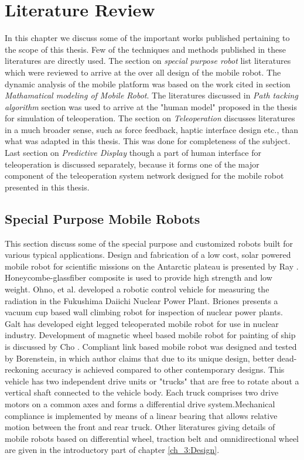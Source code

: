 \setcounter{secnumdepth}{4} 
\chapter{Literature Review}
\label{c2_LitRev}

In this chapter we  discuss some of the important works published pertaining to the scope of this thesis. Few of the techniques and methods published in these literatures are directly used. The section on \textit{special purpose robot} list literatures which were reviewed to arrive at the over all design of the mobile robot. The dynamic analysis of the mobile platform was based on the work cited in section\textit{ Mathamatical modeling of Mobile Robot}. The literatures discussed in \textit{Path tacking algorithm}  section was used to arrive at the "human model" proposed in the thesis for simulation of teleoperation. The section on \textit{Teleoperation} discusses literatures in a much broader sense, such as force feedback, haptic interface  design etc., than what was adapted in this thesis. This was done for completeness of the subject. Last section on \textit{Predictive Display} though a part of human interface for teleoperation is discussed separately, because it forms one of the major component of the teleoperation system network designed  for the mobile robot  presented in this thesis.   
\section{ Special Purpose Mobile Robots}
This section discuss some of the special purpose and customized robots built for various typical applications. Design and fabrication of a low cost, solar powered mobile robot for  scientific missions on the Antarctic plateau is presented by Ray  \cite{ray2005design}. Honeycombe-glassfiber composite is used to provide high strength and low weight. Ohno, et al. \cite{ohno2011robotic}   developed a robotic control vehicle for measuring the radiation in the Fukushima Daiichi Nuclear Power Plant. Briones \cite{briones1994wall} presents a vacuum cup based wall climbing robot for inspection of  nuclear power plants. Galt \cite{galt1997tele} has developed eight legged teleoperated mobile robot for use in  nuclear industry. Development of magnetic wheel based mobile robot for painting of ship is discussed by Cho \cite{cho2013study}. Compliant link based mobile robot was designed and tested by Borenstein\cite{borenstein1995control}, in which author claims that due to its unique design, better dead-reckoning accuracy is achieved compared to other contemporary designs. This vehicle has two independent drive units or "trucks" that are free to rotate about a vertical shaft connected to the vehicle body. Each truck comprises two drive motors on a common axes and forms a differential drive system.Mechanical compliance is implemented by means of a linear bearing that allows relative motion between the front and rear truck. Other literatures giving details of  mobile robots based on   differential wheel, traction belt and omnidirectional wheel are given in the introductory part of chapter \ref{ch_3:Design}.

